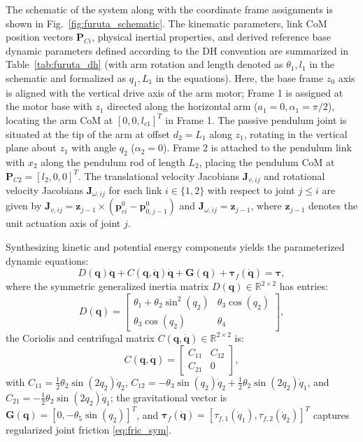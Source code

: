 \documentclass[lettersize,journal]{IEEEtran}
\begin{document}
The schematic of the system along with the coordinate frame assignments is shown in Fig.~\ref{fig:furuta_schematic}. The kinematic parameters, link CoM position vectors $\bm{P}_{Ci}$, physical inertial properties, and derived reference base dynamic parameters defined according to the DH convention are summarized in Table~\ref{tab:furuta_dh} (with arm rotation and length denoted as $\theta_1, l_1$ in the schematic and formalized as $q_1, L_1$ in the equations). Here, the base frame $z_0$ axis is aligned with the vertical drive axis of the arm motor; Frame 1 is assigned at the motor base with $z_1$ directed along the horizontal arm ($a_1 = 0, \alpha_1 = \pi/2$), locating the arm CoM at $[0, 0, l_{c1}]^T$ in Frame 1. The passive pendulum joint is situated at the tip of the arm at offset $d_2 = L_1$ along $z_1$, rotating in the vertical plane about $z_1$ with angle $q_2$ ($\alpha_2 = 0$). Frame 2 is attached to the pendulum link with $x_2$ along the pendulum rod of length $L_2$, placing the pendulum CoM at $\bm{P}_{C2} = [l_2, 0, 0]^T$. The translational velocity Jacobians $\bm{J}_{v,ij}$ and rotational velocity Jacobians $\bm{J}_{\omega,ij}$ for each link $i \in \{1, 2\}$ with respect to joint $j \le i$ are given by $\bm{J}_{v,ij} = \bm{z}_{j-1} \times (\bm{p}_{ci}^0 - \bm{p}_{0,j-1}^0)$ and $\bm{J}_{\omega,ij} = \bm{z}_{j-1}$, where $\bm{z}_{j-1}$ denotes the unit actuation axis of joint $j$.

Synthesizing kinetic and potential energy components yields the parameterized dynamic equations:
\begin{equation}
    D(\bm{q})\ddot{\bm{q}} + C(\bm{q}, \dot{\bm{q}})\dot{\bm{q}} + \bm{G}(\bm{q}) + \bm{\tau}_f(\dot{\bm{q}}) = \bm{\tau},
    \label{eq:rifp_dynamics}
\end{equation}
where the symmetric generalized inertia matrix $D(\bm{q}) \in \mathbb{R}^{2 \times 2}$ has entries:
\begin{equation}
    D(\bm{q}) = \begin{bmatrix}
        \theta_1 + \theta_2 \sin^2(q_2) & \theta_3 \cos(q_2) \\
        \theta_3 \cos(q_2)              & \theta_4
    \end{bmatrix},
    \label{eq:D_furuta}
\end{equation}
the Coriolis and centrifugal matrix $C(\bm{q}, \dot{\bm{q}}) \in \mathbb{R}^{2 \times 2}$ is:
\begin{equation}
    C(\bm{q}, \dot{\bm{q}}) = \begin{bmatrix}
        C_{11} & C_{12} \\
        C_{21} & 0
    \end{bmatrix},
    \label{eq:C_furuta}
\end{equation}
with $C_{11} = \frac{1}{2}\theta_2 \sin(2q_2)\dot{q}_2$, $C_{12} = -\theta_3 \sin(q_2)\dot{q}_2 + \frac{1}{2}\theta_2 \sin(2q_2)\dot{q}_1$, and $C_{21} = -\frac{1}{2}\theta_2 \sin(2q_2)\dot{q}_1$; the gravitational vector is $\bm{G}(\bm{q}) = [0, -\theta_5 \sin(q_2)]^T$, and $\bm{\tau}_f(\dot{\bm{q}}) = [\tau_{f,1}(\dot{q}_1), \tau_{f,2}(\dot{q}_2)]^T$ captures regularized joint friction \eqref{eq:fric_sym}.
\end{document}
